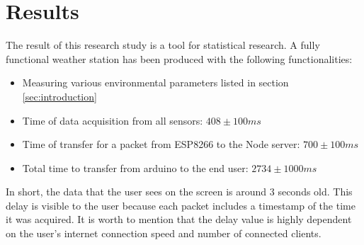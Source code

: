 \section{Results}
\label{sec:results}
The result of this research study is a tool for statistical research. A fully functional
weather station has been produced with the following functionalities:
\begin{itemize}
  \item Measuring various environmental parameters listed in section \ref{sec:introduction}
  \item Time of data acquisition from all sensors: $408\pm 100 ms$
  \item Time of transfer for a packet from ESP8266 to the Node server: $700\pm100ms$
  \item Total time to transfer from arduino to the end user: $2734\pm1000ms$
\end{itemize}

In short, the data that the user sees on the screen is around 3 seconds old. This delay is visible to the user because each packet includes a timestamp
of the time it was acquired.
It is worth to mention that the delay value is highly dependent on the user's internet connection speed and number of connected clients.
